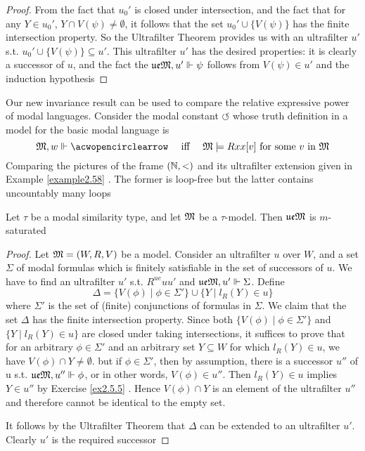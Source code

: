 \documentclass[11pt]{article}
\newcommand{\ue}{\fu\fe}
\begin{document}
\begin{proof}
From the fact that \(u_0'\) is closed under intersection, and the fact that
for any \(Y\in u_0'\), \(Y\cap V(\psi)\neq\emptyset\), it follows that the set
\(u_0'\cup\{V(\psi)\}\) has the finite intersection property. So the
Ultrafilter Theorem provides us with an ultrafilter \(u'\) s.t.
\(u_0'\cup\{V(\psi)\}\subseteq u'\). This ultrafilter \(u'\) has the desired
properties: it is clearly a successor of \(u\), and the fact the
\(\ue\fM,u'\Vdash\psi\) follows from \(V(\psi)\in u'\) and the induction hypothesis
\end{proof}

\begin{examplle}[]
Our new invariance result can be used to compare the relative expressive
power of modal languages. Consider the modal constant
\(\acwopencirclearrow\) whose truth definition in a model for the basic
modal language is
\begin{equation*}
\fM,w\Vdash\acwopencirclearrow \quad\text{ iff }\quad
\fM\models Rxx[v]\text{ for some $v$ in }\fM
\end{equation*}
Comparing the pictures of the frame \((\mathbb{N},<)\) and its ultrafilter extension
given in Example \ref{example2.58} . The former is loop-free but the latter
contains uncountably many loops
\end{examplle}

\begin{proposition}[]
\label{prop2.61}
Let \(\tau\) be a modal similarity type, and let \(\mathfrak{M}\) be a \(\tau\)-model. Then
\(\ue\fM\) is \(m\)-saturated
\end{proposition}

\begin{proof}
Let \(\mathfrak{M}=(W,R,V)\) be a model. Consider an ultrafilter \(u\) over \(W\),
and a set \(\Sigma\) of modal formulas which is finitely satisfiable in the set of
successors of \(u\). We have to find an ultrafilter \(u'\) s.t.
\(R^{ue}uu'\) and \(\ue\fM,u'\Vdash\Sigma\). Define
\begin{equation*}
\Delta=\{V(\phi)\mid\phi\in\Sigma'\}\cup\{Y\mid l_R(Y)\in u\}
\end{equation*}
where \(\Sigma'\) is the set of (finite) conjunctions of formulas in \(\Sigma\). We
claim that the set \(\Delta\) has the finite intersection property. Since both
\(\{V(\phi)\mid\phi\in\Sigma'\}\) and \(\{Y\mid l_R(Y)\in u\}\) are closed
under taking intersections, it suffices to prove that for an arbitrary
\(\phi\in\Sigma'\) and an arbitrary set \(Y\subseteq W\) for which
\(l_R(Y)\in u\), we have \(V(\phi)\cap Y\neq\emptyset\). but if
\(\phi\in\Sigma'\), then by assumption, there is a successor \(u''\) of u
s.t. \(\ue\fM,u''\Vdash\phi\), or in other words, \(V(\phi)\in u''\). Then
\(l_R(Y)\in u\) implies \(Y\in u''\) by Exercise \ref{ex2.5.5} . Hence
\(V(\phi)\cap Y\) is an element of the ultrafilter \(u''\) and therefore cannot
be identical to the empty set.

It follows by the Ultrafilter Theorem that \(\Delta\) can be extended to an
ultrafilter \(u'\). Clearly \(u'\) is the required successor
\end{proof}
\end{document}
